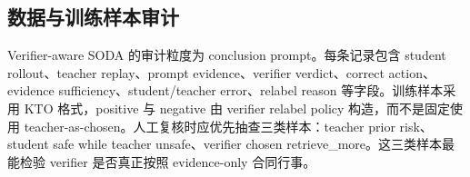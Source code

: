 \documentclass[UTF8,a4paper,12pt]{ctexart}
\begin{document}
\subsection{数据与训练样本审计}

Verifier-aware SODA 的审计粒度为 conclusion prompt。每条记录包含 student rollout、teacher replay、prompt evidence、verifier verdict、correct action、evidence sufficiency、student/teacher error、relabel reason 等字段。训练样本采用 KTO 格式，positive 与 negative 由 verifier relabel policy 构造，而不是固定使用 teacher-as-chosen。人工复核时应优先抽查三类样本：teacher prior risk、student safe while teacher unsafe、verifier chosen retrieve\_more。这三类样本最能检验 verifier 是否真正按照 evidence-only 合同行事。
\end{document}
